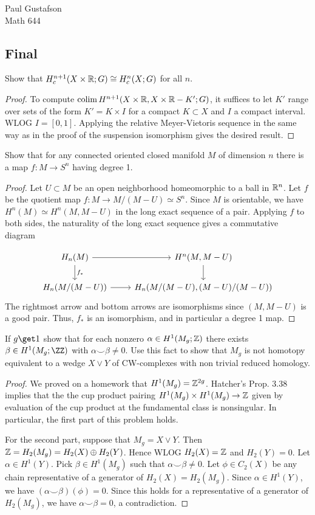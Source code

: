 \documentclass{article}
\begin{document}
\noindent Paul Gustafson\\
\noindent Math 644

\subsection*{Final}
 Show that $H_c^{n+1}(X \times \mathbb{R}; G) \cong H_c^n(X; G)$ for all $n$.
\begin{proof}
To compute $\operatorname{colim} H^{n+1}(X \times \mathbb{R}, X \times \mathbb{R} - K'; G)$, it suffices to let $K'$ range over sets of the form $K' = K \times I$ for a compact $K \subset X$ and $I$ a compact interval. WLOG $I = [0,1]$.  Applying the relative Meyer-Vietoris sequence in the same way as in the proof of the suspension isomorphism gives the desired result.
\end{proof}

 Show that for any connected oriented closed manifold $M$ of dimension $n$ there is a map $f : M \to S^n$ having degree 1.
\begin{proof}
Let $U \subset M$ be an open neighborhood homeomorphic to a ball in $\mathbb{R}^n$.  Let $f$ be the quotient map $f: M \to M/(M-U) \simeq S^n$.
Since $M$ is orientable, we have $H^n(M) \simeq H^n(M, M - U)$ in the long exact sequence of a pair. Applying $f$ to both sides, the 
naturality of the long exact sequence gives a commutative diagram

\[
\begin{tikzcd}
H_n(M) \arrow{r} \arrow{d}{f_*} &  H^n(M, M - U) \arrow{d} \\
H_n(M/(M - U)) \arrow{r} & H_n(M/(M - U), (M - U)/(M - U))
\end{tikzcd}
\]
The rightmost arrow and bottom arrows are isomorphisms since $(M, M-U)$ is a good pair.  Thus, $f_*$ is an isomorphism, and in particular a 
degree 1 map.
\end{proof}

 If $g \get 1$ show that for each nonzero $\alpha \in H^1(M_g; \mathbb{Z})$ there exists $\beta \in H^1(M_g;\ZZ)$ with
$\alpha \smile \beta \neq 0$. Use this fact to show that $M_g$ is not homotopy equivalent to a wedge $X \vee Y$ of 
CW-complexes with non trivial reduced homology.

\begin{proof}
We proved on a homework that $H^1(M_g) = \mathbb{Z}^{2g}$. Hatcher's Prop. 3.38 implies that the the cup product pairing
$H^1(M_g) \times H^1(M_g) \to \mathbb{Z}$ given by evaluation of the cup product at the fundamental class is nonsingular. 
In particular, the first part of this problem holds.

For the second part, suppose that $M_g = X \vee Y$. Then $\mathbb{Z} = H_2(M_g) = H_2(X) \oplus H_2(Y)$.  Hence WLOG $H_2(X) = \mathbb{Z}$ and $H_2(Y) = 0$. 
Let $\alpha \in H^1(Y)$. Pick $\beta \in H^1(M_g)$ such that $\alpha \smile \beta \neq 0$.
Let $\phi \in C_2(X)$ be any chain representative of a generator of $H_2(X) = H_2(M_g)$.  Since $\alpha \in H^1(Y)$, we have
$(\alpha \smile \beta)(\phi) = 0$.  Since this holds for a representative of a generator of $H_2(M_g)$, we have $\alpha \smile \beta = 0$, a contradiction.
\end{proof}
\end{document}
